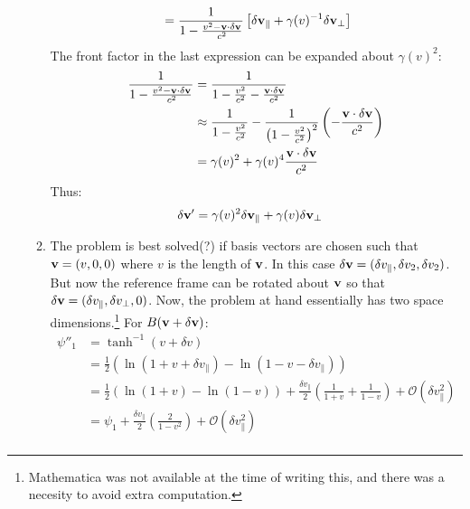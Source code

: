 \documentclass[12pt,a4]{article}
\begin{document}
\begin{enumerate}
\begin{enumerate}
\begin{align*}
                          &= \frac{1}{1 - \frac{ v^2 - {\bf v}\cdot \delta {\bf v}}{c^2}}\left[ \delta {\bf v}_\parallel +  \gamma(v)^{-1} \delta {\bf v}_\perp\right]\\
        \end{align*}
        The front factor in the last expression can be expanded about $\gamma(v)^2$:
        \begin{align*}
          \frac{1}{1 - \frac{ v^2 - {\bf v}\cdot \delta {\bf v}}{c^2}} &= \frac{1}{1 - \frac{ v^2 }{c^2} - \frac{{\bf v}\cdot \delta {\bf v}}{c^2}}\\
                                                                       &\approx \frac{1}{1 - \frac{ v^2 }{c^2} } - \frac{1}{\left(1 - \frac{ v^2 }{c^2}\right)^2 }\left(- \frac{{\bf v}\cdot \delta {\bf v}}{c^2}\right)\\
                                                                       &= \gamma(v)^2 + \gamma(v)^4 \frac{{\bf v}\cdot \delta {\bf v}}{c^2}
        \end{align*}
        Thus:
        \begin{align*}
          \delta {\bf v}' &= \gamma(v)^2 \delta {\bf v}_\parallel +  \gamma(v) \delta {\bf v}_\perp
        \end{align*}
      \item
        The problem is best solved(?) if basis vectors are chosen such that ${\bf v} = (v, 0, 0)$ where $v$ is the length of ${\bf v}$.
        In this case ${\bf \delta v} = ( \delta v_\parallel, \delta v_2, \delta v_2)$.
        But now the reference frame can be rotated about ${\bf v}$ so that ${\bf \delta v} = ( \delta v_\parallel, \delta v_\perp, 0)$.
        Now, the problem at hand essentially has two space dimensions.\footnote{Mathematica was not available at the time of writing this, and there was a necesity to avoid extra computation.}
        For $B({\bf v + \delta v})$:
        \begin{align*}
          \psi''_1 &= \tanh^{-1}(v + \delta v) \\
                  &= \frac{1}{2}\left(\ln(1 + v + \delta v_\parallel) - \ln(1 - v - \delta v_\parallel)\right)\\
                  &= \frac{1}{2}\left(\ln(1 + v) - \ln(1 - v)\right) + \frac{\delta v_\parallel}{2}\left(\frac{1}{1 + v} + \frac{1}{1 - v}\right) + \mathcal{O}(\delta v_\parallel^2)\\
                  &= \psi_1 + \frac{\delta v_\parallel}{2}\left(\frac{2}{1 - v^2}\right) + \mathcal{O}(\delta v_\parallel^2)\\

\end{align*}
\end{enumerate}
\end{enumerate}
\end{document}

